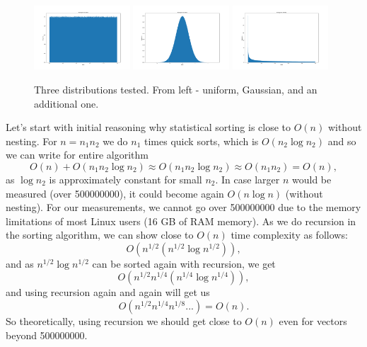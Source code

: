 \documentclass[12pt]{article}
\begin{document}
		\begin{figure}
		\begin{center}
			\includegraphics[width=0.32\textwidth]{fig_dist_norm}
			\includegraphics[width=0.32\textwidth]{fig_dist_gauss}
			\includegraphics[width=0.32\textwidth]{fig_dist_weird}
		\end{center}
		\caption{Three distributions tested. From left - uniform, Gaussian, and an additional one.}
		\label{fig4}
		\end{figure}		
						
		Let's start with initial reasoning why statistical sorting is close to $O(n)$ without nesting. For $n = n_1 n_2$ we do $n_1$ times quick sorts, which is $O(n_2 \log n_2)$ and so we can write for entire algorithm
		\[
		O(n) + O(n_1 n_2 \log n_2) \approx O(n_1 n_2 \log n_2) \approx O(n_1 n_2) = O(n),
		\]
		as $\log n_2$ is approximately constant for small $n_2$. In case larger $n$ would be measured (over 500000000), it could become again $O(n \log n)$ (without nesting). For our measurements, we cannot go over 500000000 due to the memory limitations of most Linux users (16 GB of RAM memory). 
		As we do recursion in the sorting algorithm, we can show close to $O(n)$ time complexity as follows:
		\[
		O(n^{1/2} (n^{1/2} \log n^{1/2})),
		\]
		and as $n^{1/2} \log n^{1/2}$ can be sorted again with recursion, we get
		\[
		O(n^{1/2} n^{1/4} (n^{1/4} \log n^{1/4})),
		\]
		and using recursion again and again will get us
		\[
		O(n^{1/2} n^{1/4} n^{1/8} ...) = O(n).
		\]
		So theoretically, using recursion we should get close to $O(n)$ even for vectors beyond 500000000.
        
\end{document}
